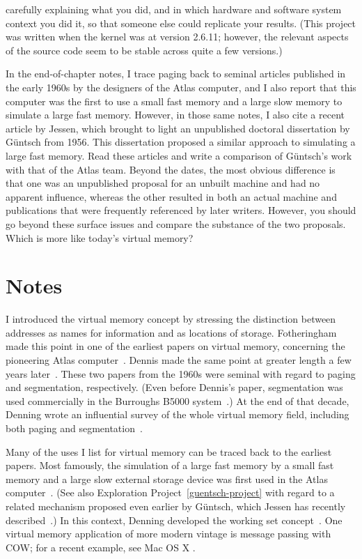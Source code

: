 \begin{chapterEnumerate}
carefully explaining what you did, and in which hardware and software
system context you did it, so that someone else could replicate
your results.
(This project was written when the kernel
was at version 2.6.11; however, the relevant aspects of the
source code seem to be stable across quite a few versions.)
\item
\label{guentsch-project}
In the end-of-chapter notes, I trace paging back to seminal articles
published in the early 1960s by the designers of the Atlas computer,
and I also report that this computer was the first to use a small fast
memory and a large slow memory to simulate a large fast memory.
However, in those same notes, I also cite a recent article by
Jessen, which brought to light an unpublished doctoral dissertation by
G{\"u}ntsch from 1956.  This dissertation proposed a similar approach
to simulating a large fast memory.  Read these articles and write a
comparison of G{\"u}ntsch's work with that of the Atlas team.  Beyond
the dates, the most obvious difference is that one was an
unpublished proposal for an unbuilt machine and had no apparent
influence, whereas the other resulted in both an actual machine and
publications that were frequently referenced by later writers.
However, you should go beyond these surface issues and compare the
substance of the two proposals.  Which is more like today's virtual memory?
\end{chapterEnumerate}

\section*{Notes}
I introduced the virtual memory concept by stressing the distinction
between addresses as names for information and as locations of
storage.  Fotheringham made this point in one of the earliest papers
on virtual memory, concerning the pioneering Atlas
computer~\cite{max1052}.  Dennis made the same point at greater length
a few years later~\cite{max1035}.  These two papers from the 1960s
were seminal with regard to paging and segmentation, respectively.  (Even before Dennis's paper, segmentation
was used commercially in the Burroughs B5000 system~\cite{max1194}.)
At
the end of that decade, Denning wrote an influential survey of the
whole virtual memory field, including both paging and
segmentation~\cite{max1018}.

Many of the uses I list for virtual memory can be traced back to the
earliest papers.  Most famously, the simulation of a large fast memory
by a small fast memory and a large slow external storage device was
first used in the Atlas computer~\cite{max1052,max1053}.
(See also Exploration Project~\ref{guentsch-project} with regard to a
related mechanism proposed even earlier by G{\"u}ntsch, which Jessen
has recently described~\cite{max1173}.) In this
context, Denning developed the working set concept~\cite{max1017}.
One virtual memory application of more modern vintage is message
passing with COW; for a recent example, see Mac OS X \cite{max1076}.

